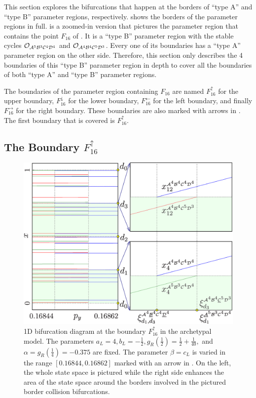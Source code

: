 This section explores the bifurcations that happen at the borders of ``type A'' and ``type B'' parameter regions, respectively.
 shows the borders of the parameter regions in full.
 is a zoomed-in version that pictures the parameter region that contains the point $F_{16}$ of .
It is a ``type B'' parameter region with the stable cycles $\mathcal{O}_{\mathcal{A}^5\mathcal{B}^3\mathcal{C}^4\mathcal{D}^4}$ and $\mathcal{O}_{\mathcal{A}^4\mathcal{B}^4\mathcal{C}^5\mathcal{D}^3}$.
Every one of its boundaries has a ``type A'' parameter region on the other side.
Therefore, this section only describes the 4 boundaries of this ``type B'' parameter region in depth to cover all the boundaries of both ``type A'' and ``type B'' parameter regions.

The boundaries of the parameter region containing $F_{16}$ are named $F_{16}^\uparrow$ for the upper boundary, $F_{16}^\downarrow$ for the lower boundary, $F_{16}^\leftarrow$ for the left boundary, and finally $F_{16}^\rightarrow$ for the right boundary.
These boundaries are also marked with arrows in .
The first boundary that is covered is $F_{16}^\uparrow$.

\subsection{The Boundary $F_{16}^\uparrow$}
\label{sec:arch.bif.U}

\begin{figure}
	\centering
	\includegraphics[width=.7 \textwidth]{../Figures/6/6.4/result.png}
	\caption[1D bifurcation diagram at the boundary $F_{16}^\uparrow$ in the archetypal model]{
		1D bifurcation diagram at the boundary $F_{16}^\uparrow$ in the archetypal model.
		The parameters $a_L = 4, b_L = -\frac{1}{2}, g_R\left(\frac{1}{2}\right) = \frac{1}{2} + \frac{1}{40},$ and $\alpha = g_R\left(\frac{1}{4}\right) = -0.375$ are fixed.
		The parameter $\beta = c_L$ is varied in the range $[0.16844, 0.16862]$ marked with an arrow in .
		On the left, the whole state space is pictured while the right side enhances the area of the state space around the borders involved in the pictured border collision bifurcations.
	}
	\label{fig:arch.bif.F.up}
\end{figure}

